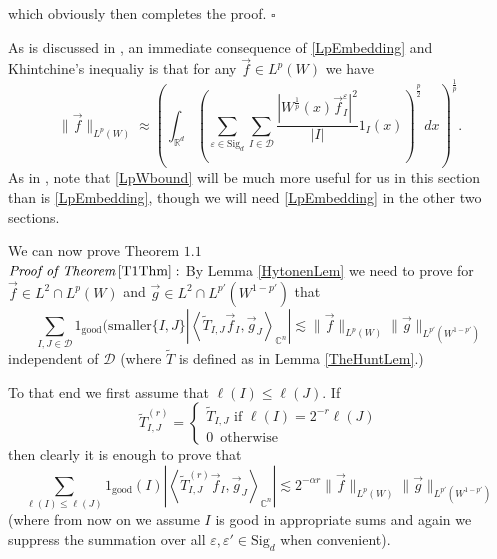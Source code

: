 \documentclass[12pt,reqno ]{amsart}
\numberwithin{equation}{section}
\theoremstyle{definition}
\newcommand{\C}{\ensuremath{\mathbb{C}^n}}
\newcommand{\Rd}{\ensuremath{\mathbb{R}^d}}
\newcommand{\D}{\ensuremath{\mathscr{D}}}
\newcommand{\V}[1]{\ensuremath{\vec{#1}}}
\newcommand{\inrd}{\ensuremath{\int_{\Rd}}}
\newcommand{\ip}[2]{\ensuremath{\left\langle#1,#2\right\rangle}}
\newcommand{\W}[1]{\ensuremath{\widetilde{#1}}}
\renewcommand{\S}{\ensuremath{\text{Sig}_d}}
\begin{document}
\noindent which obviously then completes the proof. \hfill $\square$





As is discussed in \cite{NT}, an immediate consequence of \eqref{LpEmbedding}  and Khintchine's inequaliy is that for any $\V{f} \in L^p(W)$ we have \begin{equation} \label{LpWbound} \|\V{f}\|_{L^p(W)} \approx \left( \inrd \left(\sum_{\varepsilon \in \S} \sum_{I \in \D} \frac{|W^\frac{1}{p} (x) {\V{f}}_I ^\varepsilon |^2 }{|I|} 1_I (x)  \right)^\frac{p}{2} \, dx \right)^\frac{1}{p}. \end{equation}  As in \cite{NT}, note that \eqref{LpWbound} will be much more useful for us in this section than is \eqref{LpEmbedding}, though we will need \eqref{LpEmbedding} in the other two sections.


We can now prove Theorem $1.1$ \\

\noindent $\textit{Proof of Theorem} \, \ref{T1Thm} : $ By Lemma \ref{HytonenLem} we need to prove for $\vec{f} \in L^2 \cap L^p(W)$ and $\vec{g} \in L^2\cap L^{p'}(W^{1 - p'})$ that \begin{equation*} \sum_{I, J \in \D} 1_\text{good} (\text{smaller}\{I, J\} \left|\ip{\widetilde{T}  _{I, J} \vec{f}_I}{\vec{g}_J}_{\C}\right| \lesssim \|\V{f}\|_{L^p(W)} \|\V{g}\|_{L^{p'}(W^{1 - p'})} \end{equation*} independent of $\D$ (where $\W{T}$ is defined as in Lemma \ref{TheHuntLem}.)

To that end we first assume that $\ell(I) \leq \ell(J)$.  If \begin{equation*}  \W{T}^{(r)} _{I, J} = \left\{
     \begin{array}{lr}
     \displaystyle  \W{T}_{I, J} \text{ if } \ell(I) = 2^{-r} \ell(J) \\
     \displaystyle 0 \, \text{ otherwise} \end{array} \right.  \end{equation*}  then clearly it is enough to prove that
\begin{equation*} \sum_{\ell(I) \leq  \ell(J) }  1_\text{good} (I)\left|\ip{\widetilde{T} ^{(r)}  _{I, J} \vec{f}_I}{\vec{g}_J}_{\C}\right| \lesssim 2^{-\alpha r} \|\V{f}\|_{L^p(W)} \|\V{g}\|_{L^{p'}(W^{1 - p'})} \end{equation*} (where from now on we assume $I$ is good in appropriate sums and again we suppress the summation over all $\varepsilon, \varepsilon' \in \S$ when convenient).
\end{document}
